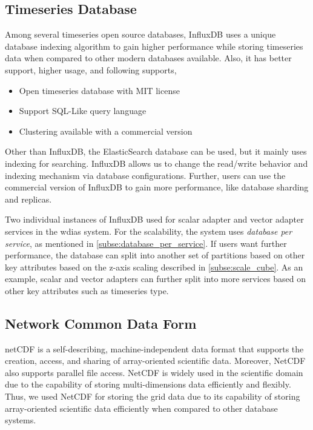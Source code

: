 \subsection{Timeseries Database}
\label{subse:influxdb}

Among several timeseries open source databases, InfluxDB \cite{InfluxDBInfluxDBDocumentation} uses a unique database indexing algorithm to gain higher performance while storing timeseries data when compared to other modern databases available. Also, it has better support, higher usage, and following supports,

\begin{itemize}
  \item Open timeseries database with MIT license
  \item Support SQL-Like query language
  \item Clustering available with a commercial version
\end{itemize}

Other than InfluxDB, the ElasticSearch database can be used, but it mainly uses indexing for searching. InfluxDB allows us to change the read/write behavior and indexing mechanism via database configurations. Further, users can use the commercial version of InfluxDB to gain more performance, like database sharding and replicas.

Two individual instances of InfluxDB used for scalar adapter and vector adapter services in the \acrshort{wdias} system. For the scalability, the system uses \emph{database per service}, as mentioned in \cref{subse:database_per_service}. If users want further performance, the database can split into another set of partitions based on other key attributes based on the z-axis scaling described in \cref{subse:scale_cube}. As an example, scalar and vector adapters can further split into more services based on other key attributes such as timeseries type.

\subsection{Network Common Data Form}
\label{subse:netcdf}

\acrshort{netCDF} \cite{UnidataNetworkForm} is a self-describing, machine-independent data format that supports the creation, access, and sharing of array-oriented scientific data. Moreover, NetCDF also supports parallel file access. NetCDF is widely used in the scientific domain due to the capability of storing multi-dimensions data efficiently and flexibly. Thus, we used NetCDF for storing the grid data due to its capability of storing array-oriented scientific data efficiently when compared to other database systems.

